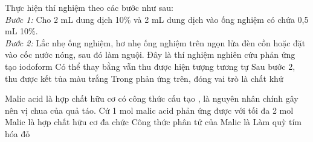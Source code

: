 \documentclass[12pt,a4paper]{article}
\begin{document}
\begin{ex}
Thực hiện thí nghiệm theo các bước như sau:\\
\textit{Bước 1:} Cho 2 mL dung dịch  10\% và 2 mL dung dịch  vào ống nghiệm có chứa 0,5 mL  10\%.\\
\textit{Bước 2:} Lắc nhẹ ống nghiệm, hơ nhẹ ống nghiệm trên ngọn lửa đèn cồn hoặc đặt vào cốc nước nóng, sau đó làm nguội.
\choiceTF
{\True Đây là thí nghiệm nghiên cứu phản ứng tạo iodoform}
{\True Có thể thay  bằng  vẫn thu được hiện tượng tương tự}
{Sau bước 2, thu được kết tủa màu trắng}
{Trong phản ứng trên,  đóng vai trò là chất khử}

\end{ex}

\begin{ex}
Malic acid là hợp chất hữu cơ có công thức cấu tạo , là nguyên nhân chính gây nên vị chua của quả táo.
\choiceTF
{\True Cứ 1 mol malic acid phản ứng được với tối đa 2 mol }
{Malic là hợp chất hữu cơ đa chức}
{Công thức phân tử của Malic là }
{\True Làm quỳ tím hóa đỏ}

\end{ex}
\end{document}
